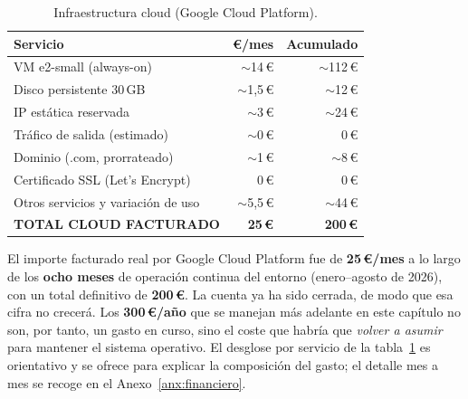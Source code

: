 \begin{table}[H]
    \centering
    \caption{Infraestructura cloud (Google Cloud Platform).}
    \label{tab:cloud}
    \begin{tabular}{lrr}
        \toprule
        \textbf{Servicio} & \textbf{\textbf{\euro}/mes} & \textbf{Acumulado} \\
        \midrule
        VM e2-small (always-on)         & $\sim$14\,\euro  & $\sim$112\,\euro \\
        Disco persistente 30\,GB        & $\sim$1,5\,\euro & $\sim$12\,\euro \\
        IP est\'atica reservada         & $\sim$3\,\euro   & $\sim$24\,\euro \\
        Tr\'afico de salida (estimado)  & $\sim$0\,\euro   & 0\,\euro \\
        Dominio (.com, prorrateado)     & $\sim$1\,\euro   & $\sim$8\,\euro \\
        Certificado SSL (Let's Encrypt) & 0\,\euro         & 0\,\euro \\
        Otros servicios y variaci\'on de uso & $\sim$5,5\,\euro & $\sim$44\,\euro \\
        \midrule
        \textbf{TOTAL CLOUD FACTURADO}  & \textbf{25\,\euro} & \textbf{200\,\euro} \\
        \bottomrule
    \end{tabular}
\end{table}

El importe facturado real por Google Cloud Platform fue de
\textbf{25\,\euro/mes} a lo largo de los \textbf{ocho meses} de operaci\'on
continua del entorno (enero--agosto de 2026), con un total definitivo de
\textbf{200\,\euro}. La cuenta ya ha sido cerrada, de modo que esa cifra
no crecer\'a. Los \textbf{300\,\euro/a\~no} que se manejan m\'as adelante
en este cap\'itulo no son, por tanto, un gasto en curso, sino el coste
que habr\'ia que \emph{volver a asumir} para mantener el sistema
operativo. El desglose por servicio de la
tabla~\ref{tab:cloud} es orientativo y se ofrece para explicar la
composici\'on del gasto; el detalle mes a mes se recoge en el
Anexo~\ref{anx:financiero}.

